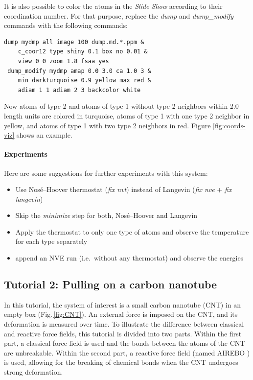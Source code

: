 \documentclass[9pt,tutorial]{livecoms}
\begin{document}
It is also possible to color the atoms in the \textit{Slide Show}
according to their coordination number. For that purpose, replace the
\textit{dump} and \textit{dump\_modify} commands with the following
commands:
{\normalsize
\begin{verbatim}
dump mydmp all image 100 dump.md.*.ppm &
    c_coor12 type shiny 0.1 box no 0.01 &
    view 0 0 zoom 1.8 fsaa yes
 dump_modify mydmp amap 0.0 3.0 ca 1.0 3 &
    min darkturquoise 0.9 yellow max red &
    adiam 1 1 adiam 2 3 backcolor white
\end{verbatim}
}

Now atoms of type 2 and atoms of type 1 without type 2 neighbors
within 2.0 length units are colored in turquoise, atoms of type 1 with
one type 2 neighbor in yellow, and atoms of type 1 with two type 2
neighbors in red.  Figure \ref{fig:coords-viz} shows an example.

\paragraph{Experiments}

Here are some suggestions for further experiments with this system:
\begin{itemize}
\item Use Nos\'e--Hoover thermostat (\textit{fix nvt}) instead of Langevin
  (\textit{fix nve} + \textit{fix langevin})
\item Skip the \textit{minimize} step for both, Nos\'e--Hoover and Langevin
\item Apply the thermostat to only one type of atoms and observe the
  temperature for each type separately
\item append an NVE run (i.e.~without any thermostat) and observe the energies
\end{itemize}

\subsection{Tutorial 2: Pulling on a carbon nanotube}
\label{carbon-nanotube-label}

In this tutorial, the system of interest is a small carbon nanotube
(CNT) in an empty box (Fig.\,\ref{fig:CNT}). An external force is imposed on
the CNT, and its deformation is measured over time. To illustrate the
difference between classical and reactive force fields, this tutorial is
divided into two parts. Within the first part, a classical force field is
used and the bonds between the atoms of the CNT are unbreakable. Within the
second part, a reactive force field (named AIREBO \cite{stuart2000reactive})
is used, allowing for the breaking of chemical bonds when the CNT undergoes
strong deformation.
\end{document}
